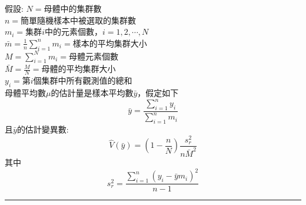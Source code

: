 		假設:
		$N=$母體中的集群數\\
		$n=$簡單隨機樣本中被選取的集群數\\
		$m_i=$集群$i$中的元素個數，$i=1,2,\cdots,N$\\
		$\bar{m} = \frac{1}{n}\sum^n_{i=1} m_i =$樣本的平均集群大小\\
		$M=\sum^N_{i=1} m_{i} = $母體元素個數\\
		$\bar{M} = \frac{M}{N} = $母體的平均集群大小\\
		$y_i=$第$i$個集群中所有觀測值的總和\\
		母體平均數$\mu$的估計量是樣本平均數$\bar{y}$，假定如下
		$$ \bar{y} = \frac{\sum^n_{i=1} y_i}{\sum^n_{i=1} m_i} $$
		且$\bar{y}$的估計變異數:
		$$ \hat{V}(\bar{y})=\left( 1-\frac{n}{N} \right) \frac{s^2_r}{n\bar{M}^2}$$
		其中
		$$ s^2_r = \frac{\sum^n_{i=1}(y_i-\bar{y}m_i)^2}{n-1} $$
		\rule{\textwidth}{0.2pt}

